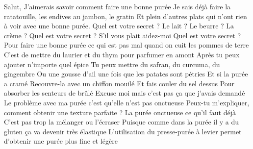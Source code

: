 \documentclass[10pt,a4paper]{article}
\begin{document}
\begin{center}
Salut, \newline
J'aimerais savoir comment faire une bonne purée \newline
Je sais déjà faire la ratatouille, les endives au jambon, le gratin \newline
Et plein d'autres plats qui n'ont rien à voir avec une bonne purée. \newline
Quel est votre secret ? \newline
Le lait ? \newline
Le beurre ? \newline
La crème ? \newline \newline
Quel est votre secret ? \newline \newline
S'il vous plait aidez-moi \newline \newline
Quel est votre secret ? \newline
Pour faire une bonne purée ce qui est pas mal quand on cuit les pommes de terre \newline
C'est de mettre du laurier et du thym pour parfumer en amont \newline
Après tu peux ajouter n'importe quel épice \newline
Tu peux mettre du safran, du curcuma, du gingembre \newline
Ou une gousse d'ail une fois que les patates sont pétries \newline
Et si la purée a cramé \newline
Recouvre-la avec un chiffon mouilé \newline
Et fais couler du sel dessus \newline
Pour absorber les senteurs de brûlé \newline
\newline
Excuse moi mais c'est pas ça que j'avais demandé \newline
Le problème avec ma purée c'est qu'elle n'est pas onctueuse \newline
Peux-tu m'expliquer, comment obtenir une texture parfaite ? \newline
La purée onctueuse ce qu'il faut déjà \newline
C'est pas trop la mélanger ou l'écraser \newline
Puisque comme dans la purée il y a du gluten ça va devenir très élastique \newline
L’utilisation du presse-purée à levier permet d’obtenir une purée plus fine et légère \newline

\end{center}
\end{document}
